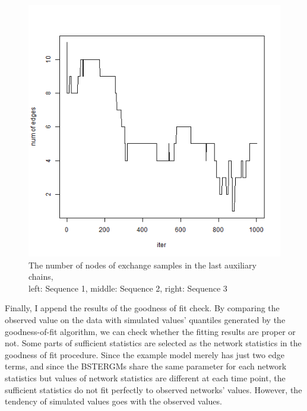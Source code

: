 \documentclass[a4paper, 11pt]{report}
\theoremstyle{definition}
\begin{document}
\begin{figure}[h]
\begin{center}
        \includegraphics[scale=0.26]{pictures/net3seq_chain1_lastsampler_num_edges.png}
    \caption{The number of nodes of exchange samples in the last auxiliary chains,\\left: Sequence 1, middle: Sequence 2, right: Sequence 3}
    \end{center}
\end{figure}
\clearpage


Finally, I append the results of the goodness of fit check.
By comparing the observed value on the data with simulated values' quantiles generated by the goodness-of-fit algorithm,
we can check whether the fitting results are proper or not.
Some parts of sufficient statistics are selected as the network statistics in the goodness of fit procedure.
Since the example model merely has just two edge terms, 
and since the BSTERGMs share the same parameter for each network statistics but values of network statistics are different at each time point, 
the sufficient statistics do not fit perfectly to observed networks' values. 
However, the tendency of simulated values goes with the observed values.
\end{document}
